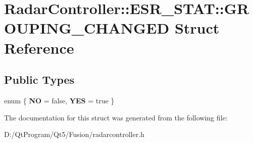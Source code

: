 \hypertarget{struct_radar_controller_1_1_e_s_r___s_t_a_t_1_1_g_r_o_u_p_i_n_g___c_h_a_n_g_e_d}{}\section{Radar\+Controller\+:\+:E\+S\+R\+\_\+\+S\+T\+A\+T\+:\+:G\+R\+O\+U\+P\+I\+N\+G\+\_\+\+C\+H\+A\+N\+G\+E\+D Struct Reference}
\label{struct_radar_controller_1_1_e_s_r___s_t_a_t_1_1_g_r_o_u_p_i_n_g___c_h_a_n_g_e_d}
\subsection*{Public Types}
\begin{DoxyCompactItemize}
\item 
\hypertarget{struct_radar_controller_1_1_e_s_r___s_t_a_t_1_1_g_r_o_u_p_i_n_g___c_h_a_n_g_e_d_ad49222ada2e1b946f1c7a5c01a9f3af7}{}enum \{ {\bfseries N\+O} = false, 
{\bfseries Y\+E\+S} = true
 \}\label{struct_radar_controller_1_1_e_s_r___s_t_a_t_1_1_g_r_o_u_p_i_n_g___c_h_a_n_g_e_d_ad49222ada2e1b946f1c7a5c01a9f3af7}

\end{DoxyCompactItemize}


The documentation for this struct was generated from the following file\+:\begin{DoxyCompactItemize}
\item 
D\+:/\+Qt\+Program/\+Qt5/\+Fusion/radarcontroller.\+h\end{DoxyCompactItemize}

